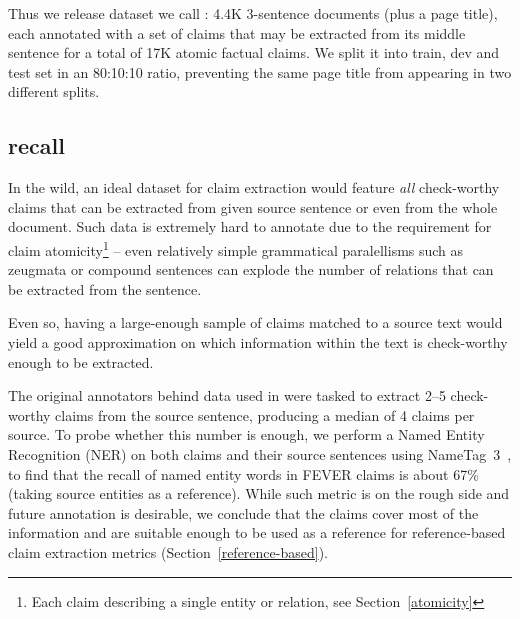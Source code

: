 Thus we release dataset we call \textbf{\ds{}}: 4.4K 3-sentence documents (plus a page title), each annotated with a set of claims that may be extracted from its middle sentence for a total of 17K atomic factual claims.
We split it into train, dev and test set in an 80:10:10 ratio, preventing the same page title from appearing in two different splits.

\subsection{\ds{} recall}
In the wild, an ideal dataset for claim extraction would feature \textit{all} check-worthy claims that can be extracted from given source sentence or even from the whole \ds{} document.
Such data is extremely hard to annotate due to the requirement for claim atomicity\footnote{Each claim describing a single entity or relation, see Section~\ref{atomicity}} -- even relatively simple grammatical paralellisms such as zeugmata or compound sentences can explode the number of relations that can be extracted from the sentence.

Even so, having a large-enough sample of claims matched to a source text would yield a good approximation on which information within the text is check-worthy enough to be extracted.

The original annotators behind data used in \ds{} were tasked to extract 2--5 check-worthy claims from the source sentence, producing a median of 4 claims per source.
To probe whether this number is enough, we perform a Named Entity Recognition (NER) on both \ds{} claims and their source sentences using NameTag~3~\cite{strakova-etal-2019-neural}, to find that the recall of named entity words in FEVER claims is about 67\% (taking source entities as a reference).
While such metric is on the rough side and future annotation is desirable, we conclude that the \ds{} claims cover most of the information and are suitable enough to be used as a reference for reference-based claim extraction metrics (Section~\ref{reference-based}).

